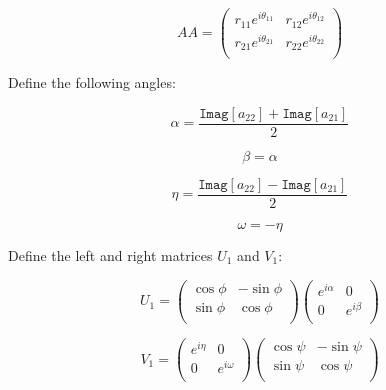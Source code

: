 \begin{equation}
AA=\left(
     \begin{array}{cc}
       r_{11}e^{i\theta_{11}} & r_{12}e^{i\theta_{12}} \\
       r_{21}e^{i\theta_{21}} & r_{22} e^{i\theta_{22}} \\
     \end{array}
   \right)
\end{equation}

Define the following angles:

\begin{equation}
\alpha=\frac{\texttt{Imag}[a_{22}]+\texttt{Imag}[a_{21}]}{2}
\end{equation}

\begin{equation}
\beta=\alpha
\end{equation}

\begin{equation}
\eta=\frac{\texttt{Imag}[a_{22}]-\texttt{Imag}[a_{21}]}{2}
\end{equation}

\begin{equation}
\omega =-\eta
\end{equation}

Define the left and right matrices $U_1$ and $V_1$:


\begin{equation}
U_1=\left(
     \begin{array}{cc}
       \cos \phi   & -\sin \phi \\
       \sin \phi & \cos \phi  \\
     \end{array}
   \right)
\left(
     \begin{array}{cc}
       e^{i\alpha}  & 0 \\
      0 & e^{i\beta} \\
     \end{array}
   \right)
\end{equation}



\begin{equation}
V_1=
\left(
     \begin{array}{cc}
       e^{i\eta}  & 0 \\
      0 & e^{i\omega} \\
     \end{array}
\right)
\left(
     \begin{array}{cc}
       \cos \psi  & -\sin \psi \\
       \sin \psi & \cos \psi  \\
       \end{array}
\right)
\end{equation}

